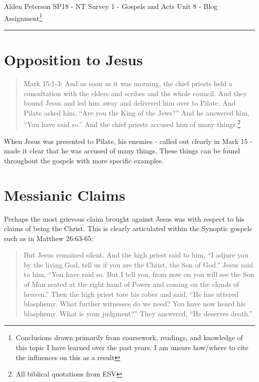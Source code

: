\documentclass[12pt]{turabian-researchpaper}
\begin{document}
\begin{singlespace}
\noindent Alden Peterson \newline
\noindent SP18 - NT Survey 1 - Gospels and Acts\newline
\noindent Unit 8 - Blog Assignment\footnote{Conclusions drawn primarily from coursework, readings, and knowledge of this topic I have learned over the past years. I am unsure how/where to cite the influences on this as a result}
\newline
\noindent\rule{4cm}{0.4pt}
\end{singlespace}




\section{Opposition to Jesus}
\begin{quotation}
Mark 15:1-3: 
And as soon as it was morning, the chief priests held a consultation with the elders and scribes and the whole council. And they bound Jesus and led him away and delivered him over to Pilate.  And Pilate asked him, “Are you the King of the Jews?” And he answered him, “You have said so.”  And the chief priests accused him of many things.\footnote{All biblical quotations from ESV}
\end{quotation}

\noindent When Jesus was presented to Pilate, his enemies - called out clearly in Mark 15 - made it clear that he was accused of many things. These things can be found throughout the gospels with more specific examples.

\section{Messianic Claims}

Perhaps the most grievous claim brought against Jesus was with respect to his claims of being the Christ. This is clearly articulated within the Synoptic gospels such as in Matthew 26:63-65:

\begin{quotation}
But Jesus remained silent. And the high priest said to him, ``I adjure you by the living God, tell us if you are the Christ, the Son of God.''  Jesus said to him, ``You have said so. But I tell you, from now on you will see the Son of Man seated at the right hand of Power and coming on the clouds of heaven.”  Then the high priest tore his robes and said, ``He has uttered blasphemy. What further witnesses do we need? You have now heard his blasphemy.  What is your judgment?'' They answered, ``He deserves death.''
\end{quotation}
\end{document}
